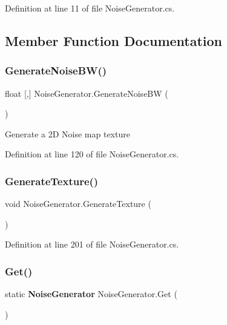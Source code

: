 Definition at line 11 of file Noise\+Generator.\+cs.



\subsection{Member Function Documentation}
\mbox{\label{class_noise_generator_a3ec891cebd7e3feaae3681383eb55531}} 
\subsubsection{Generate\+Noise\+B\+W()}
{\footnotesize\ttfamily float [,] Noise\+Generator.\+Generate\+Noise\+BW (\begin{DoxyParamCaption}{ }\end{DoxyParamCaption})}



Generate a 2D Noise map texture 



Definition at line 120 of file Noise\+Generator.\+cs.

\mbox{\label{class_noise_generator_a56b3b413e3ddb6f5f5d32ea99d41cd2c}} 
\subsubsection{Generate\+Texture()}
{\footnotesize\ttfamily void Noise\+Generator.\+Generate\+Texture (\begin{DoxyParamCaption}{ }\end{DoxyParamCaption})}



Definition at line 201 of file Noise\+Generator.\+cs.

\mbox{\label{class_noise_generator_ad917ec1709a8484619c7ffaaf2673206}} 
\subsubsection{Get()}
{\footnotesize\ttfamily static \textbf{ Noise\+Generator} Noise\+Generator.\+Get (\begin{DoxyParamCaption}{ }\end{DoxyParamCaption})\hspace{0.3cm}{\ttfamily [static]}}



